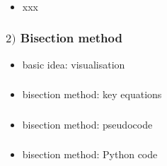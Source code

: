 \documentclass[english,14pt]{beamer}
\begin{document}
\begin{frame}[fragile]

\frametitle{}

\begin{itemize}
	\item xxx
\end{itemize}

\end{frame}


\begin{frame}[fragile]

\frametitle{$2)$ Bisection method}

\begin{itemize}
	\item basic idea: visualisation
\end{itemize}

\end{frame}


\begin{frame}[fragile]

\frametitle{}

\begin{itemize}
	\item bisection method: key equations
\end{itemize}

\end{frame}


\begin{frame}[fragile]

\frametitle{}

\begin{itemize}
	\item bisection method: pseudocode
\end{itemize}

\end{frame}


\begin{frame}[fragile]

\frametitle{}

\begin{itemize}
	\item bisection method: Python code
\end{itemize}

\end{frame}
\end{document}
